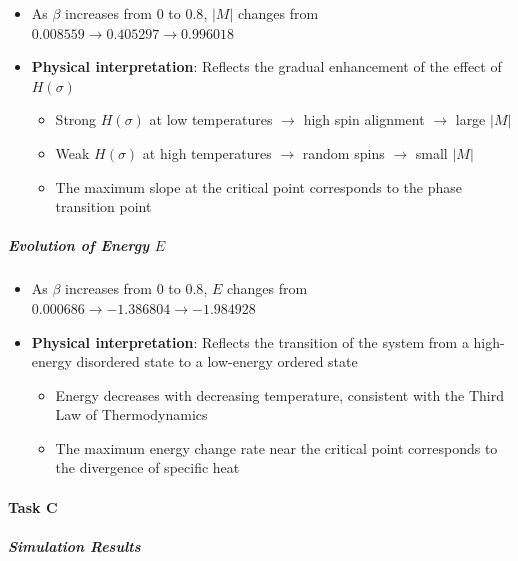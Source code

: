 \documentclass[11pt]{article}
\providecommand{\tightlist}{%
      \setlength{\itemsep}{0pt}\setlength{\parskip}{0pt}}
\begin{document}
\begin{itemize}
\tightlist
\item
  As \(\beta\) increases from \(0\) to \(0.8\), \(|M|\) changes from
  \(0.008559 \rightarrow 0.405297 \rightarrow 0.996018\)
\item
  \textbf{Physical interpretation}: Reflects the gradual enhancement of
  the effect of \(H(\sigma)\)

  \begin{itemize}
  \tightlist
  \item
    Strong \(H(\sigma)\) at low temperatures \(\rightarrow\) high spin
    alignment \(\rightarrow\) large \(|M|\)
  \item
    Weak \(H(\sigma)\) at high temperatures \(\rightarrow\) random spins
    \(\rightarrow\) small \(|M|\)
  \item
    The maximum slope at the critical point corresponds to the phase
    transition point
  \end{itemize}
\end{itemize}

\subparagraph{\texorpdfstring{Evolution of Energy
\(E\)}{Evolution of Energy E}}\label{evolution-of-energy-e}

\begin{itemize}
\tightlist
\item
  As \(\beta\) increases from \(0\) to \(0.8\), \(E\) changes from
  \(0.000686\rightarrow -1.386804 \rightarrow -1.984928\)
\item
  \textbf{Physical interpretation}: Reflects the transition of the
  system from a high-energy disordered state to a low-energy ordered
  state

  \begin{itemize}
  \tightlist
  \item
    Energy decreases with decreasing temperature, consistent with the
    Third Law of Thermodynamics
  \item
    The maximum energy change rate near the critical point corresponds
    to the divergence of specific heat
  \end{itemize}
\end{itemize}

    \paragraph{Task C}\label{task-c}

\subparagraph{Simulation Results}\label{simulation-results}
\end{document}
